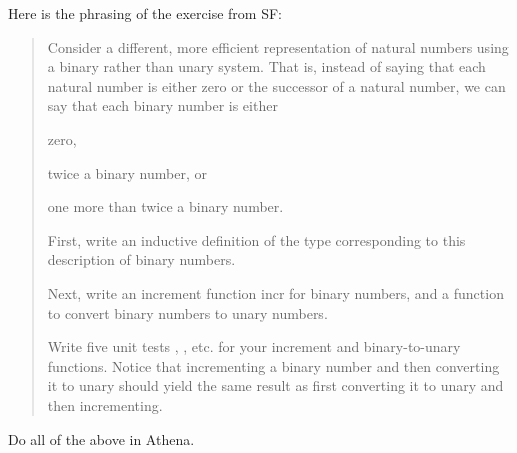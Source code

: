 %
%
Here is the phrasing of the exercise from SF:
\begin{quote}
Consider a different, more efficient representation of natural numbers using a binary rather than unary system. That is,
instead of saying that each natural number is either zero or the successor of a
natural number, we can say that each binary number is either
\bit
\item zero,
\item twice a binary number, or
\item one more than twice a binary number.
\eit
\begin{alphaEnum}
\item First, write an inductive definition of the type  corresponding to this
description of binary numbers.
\item Next, write an increment function incr for binary numbers, and a function
 to convert binary numbers to unary numbers.
\item Write five unit tests , , etc. for your increment and binary-to-unary functions. Notice that incrementing a binary
number and then converting it to unary should yield the same result as
first converting it to unary and then incrementing.
\end{alphaEnum}
\end{quote}
Do all of the above in Athena.

